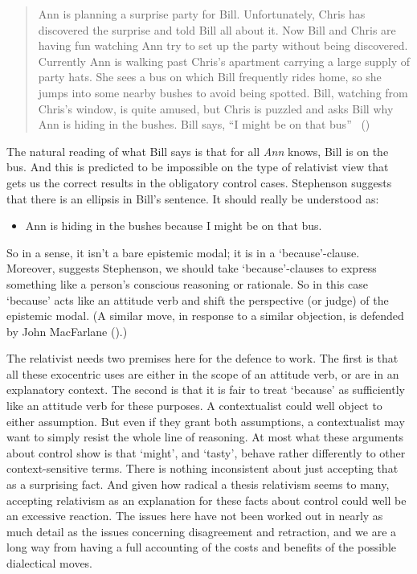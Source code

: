\documentclass[
  10pt,
  letterpaper,
  DIV=11,
  numbers=noendperiod,
  twoside]{scrartcl}
\providecommand{\tightlist}{%
  \setlength{\itemsep}{0pt}\setlength{\parskip}{0pt}}\usepackage{longtable,booktabs,array}
\begin{document}
\begin{quote}
Ann is planning a surprise party for Bill. Unfortunately, Chris has
discovered the surprise and told Bill all about it. Now Bill and Chris
are having fun watching Ann try to set up the party without being
discovered. Currently Ann is walking past Chris's apartment carrying a
large supply of party hats. She sees a bus on which Bill frequently
rides home, so she jumps into some nearby bushes to avoid being spotted.
Bill, watching from Chris's window, is quite amused, but Chris is
puzzled and asks Bill why Ann is hiding in the bushes. Bill says, ``I
might be on that bus'' ~()
\end{quote}

The natural reading of what Bill says is that for all \emph{Ann} knows,
Bill is on the bus. And this is predicted to be impossible on the type
of relativist view that gets us the correct results in the obligatory
control cases. Stephenson suggests that there is an ellipsis in Bill's
sentence. It should really be understood as:

\begin{itemize}
\tightlist
\item
  Ann is hiding in the bushes because I might be on that bus.
\end{itemize}

So in a sense, it isn't a bare epistemic modal; it is in a
`because'-clause. Moreover, suggests Stephenson, we should take
`because'-clauses to express something like a person's conscious
reasoning or rationale. So in this case `because' acts like an attitude
verb and shift the perspective (or judge) of the epistemic modal. (A
similar move, in response to a similar objection, is defended by John
MacFarlane ().)

The relativist needs two premises here for the defence to work. The
first is that all these exocentric uses are either in the scope of an
attitude verb, or are in an explanatory context. The second is that it
is fair to treat `because' as sufficiently like an attitude verb for
these purposes. A contextualist could well object to either assumption.
But even if they grant both assumptions, a contextualist may want to
simply resist the whole line of reasoning. At most what these arguments
about control show is that `might', and `tasty', behave rather
differently to other context-sensitive terms. There is nothing
inconsistent about just accepting that as a surprising fact. And given
how radical a thesis relativism seems to many, accepting relativism as
an explanation for these facts about control could well be an excessive
reaction. The issues here have not been worked out in nearly as much
detail as the issues concerning disagreement and retraction, and we are
a long way from having a full accounting of the costs and benefits of
the possible dialectical moves.
\end{document}
